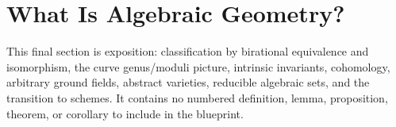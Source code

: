 \section{What Is Algebraic Geometry?}

This final section is exposition: classification by birational equivalence and isomorphism, the
curve genus/moduli picture, intrinsic invariants, cohomology, arbitrary ground fields, abstract
varieties, reducible algebraic sets, and the transition to schemes.  It contains no numbered
definition, lemma, proposition, theorem, or corollary to include in the blueprint.
